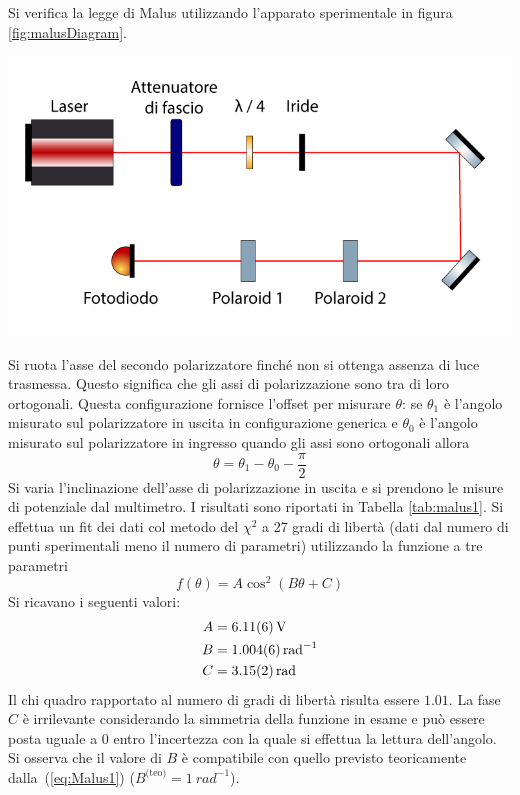 \documentclass[10pt,oneside,a4paper]{article}
\newenvironment{Figure}
  {\par\medskip\noindent\minipage{\linewidth}}
  {\endminipage\par\medskip}
\begin{document}
\begin{multicols}{2}
Si verifica la legge di Malus utilizzando l'apparato sperimentale in figura \ref{fig:malusDiagram}. 
\begin{Figure}
	\begin{center}
	\includegraphics[width=\linewidth]{malus1Diagram.png}
	\label{fig:malusDiagram}
	\end{center}
\end{Figure}
Si ruota l'asse del secondo polarizzatore finché non si ottenga assenza di luce trasmessa. Questo significa che gli assi di polarizzazione sono tra di loro ortogonali. Questa configurazione fornisce l'offset per misurare $\theta$: se $\theta_1$ è l'angolo misurato sul polarizzatore in uscita in configurazione generica e $\theta_0$ è l'angolo misurato sul polarizzatore in ingresso quando gli assi sono ortogonali allora
\[
\theta = \theta_1 - \theta_0 - \frac{\pi}{2}
\]
Si varia l'inclinazione dell'asse di polarizzazione in uscita e si prendono le misure di potenziale dal multimetro. I risultati sono riportati in Tabella \ref{tab:malus1}. Si effettua un fit dei dati col metodo del $\chi^2$ a 27 gradi di libertà (dati dal numero di punti sperimentali meno il numero di parametri) utilizzando la funzione a tre parametri
\[
f(\theta) = A\cos^2(B\theta + C)
\]
Si ricavano i seguenti valori:
\[
\begin{aligned}
A &= \SI{6.11 \pm 0.06}{V} \\
B &= \SI{1.004 \pm 0.006}{rad^{-1}} \\
C &= \SI{3.15 \pm 0.02}{rad}
\end{aligned}
\]
Il chi quadro rapportato al numero di gradi di libertà risulta essere $1.01$. La fase $C$ è irrilevante considerando la simmetria della funzione in esame e può essere posta uguale a $0$ entro l'incertezza con la quale si effettua la lettura dell'angolo. Si osserva che il valore di $B$ è compatibile con quello previsto teoricamente dalla~(\ref{eq:Malus1}) ($B^{\text{(teo)}} = \SI{1}{rad^{-1}}$).

\end{multicols}
\end{document}
